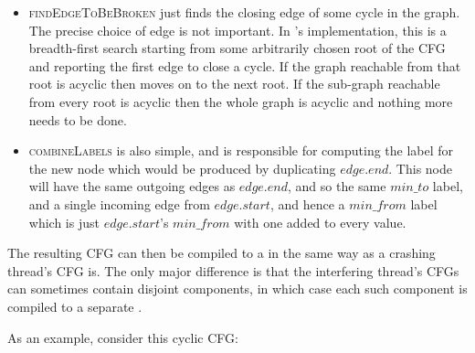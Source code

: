 \begin{itemize}
\item \textsc{findEdgeToBeBroken} just finds the closing edge of some
  cycle in the graph.  The precise choice of edge is not
  important.  In {\implementation}'s implementation, this is a
  breadth-first search starting from some arbitrarily chosen root of
  the CFG and reporting the first edge to close a cycle.  If the graph
  reachable from that root is acyclic then {\implementation} moves on
  to the next root.  If the sub-graph reachable from every root is
  acyclic then the whole graph is acyclic and nothing more needs to be
  done.
\item \textsc{combineLabels} is also simple, and is responsible for
  computing the label for the new node which would be produced by
  duplicating $\mathit{edge}.\mathit{end}$.  This node will have the
  same outgoing edges as $\mathit{edge}.\mathit{end}$, and so the same
  $min\_to$ label, and a single incoming edge from
  $\mathit{edge}.\mathit{start}$, and hence a $\mathit{min\_from}$
  label which is just $\mathit{edge}.\mathit{start}$'s
  $\mathit{min\_from}$ with one added to every value.
\end{itemize}

The resulting CFG can then be compiled to a {\StateMachine} in the
same way as a crashing thread's CFG is.  The only major difference is
that the interfering thread's CFGs can sometimes contain disjoint
components, in which case each such component is compiled to a
separate {\StateMachine}.

As an example, consider this cyclic CFG:



